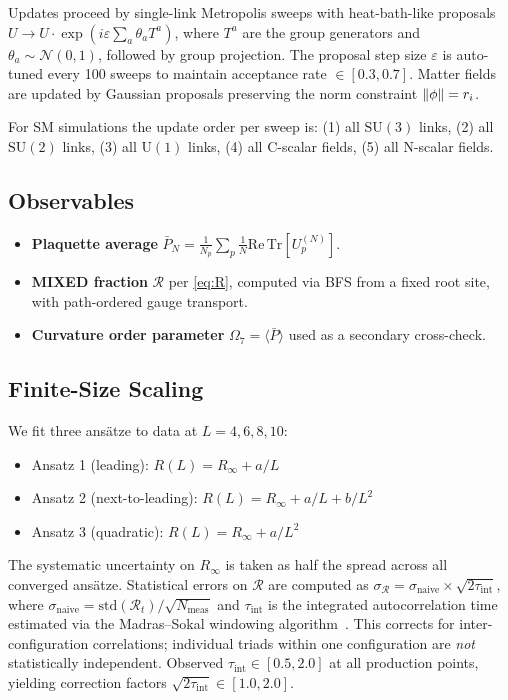 \documentclass[12pt,a4paper]{article}
\newcommand{\R}{\mathcal{R}}           %
\newcommand{\SU}[1]{\mathrm{SU}(#1)}
\newcommand{\UN}[1]{\mathrm{U}(#1)}
\theoremstyle{plain}
\theoremstyle{definition}
\theoremstyle{remark}
\begin{document}
Updates proceed by single-link Metropolis sweeps with heat-bath-like proposals
$U\to U\cdot\exp(i\varepsilon\sum_a\theta_a T^a)$, where $T^a$ are the group generators
and $\theta_a\sim\mathcal{N}(0,1)$, followed by group projection.
The proposal step size $\varepsilon$ is auto-tuned every 100 sweeps to maintain
acceptance rate $\in[0.3,0.7]$.
Matter fields are updated by Gaussian proposals preserving the norm constraint
$\norm{\phi}=r_i$.

For SM simulations the update order per sweep is:
(1) all $\SU{3}$ links, (2) all $\SU{2}$ links, (3) all $\UN{1}$ links,
(4) all C-scalar fields, (5) all N-scalar fields.

\subsection{Observables}
\label{sec:observables}

\begin{itemize}
  \item \textbf{Plaquette average} $\bar{P}_N = \frac{1}{N_p}\sum_p \frac{1}{N}\mathrm{Re}\,\mathrm{Tr}[U_p^{(N)}]$.
  \item \textbf{MIXED fraction} $\R$ per \cref{eq:R}, computed via BFS from a fixed root
        site, with path-ordered gauge transport.
  \item \textbf{Curvature order parameter} $\Omega_7 = \langle\bar{P}\rangle$ used as a
        secondary cross-check.
\end{itemize}

\subsection{Finite-Size Scaling}
\label{sec:fss_method}

We fit three ansätze to data at $L=4,6,8,10$:
\begin{itemize}
  \item Ansatz 1 (leading): $R(L) = R_\infty + a/L$
  \item Ansatz 2 (next-to-leading): $R(L) = R_\infty + a/L + b/L^2$
  \item Ansatz 3 (quadratic): $R(L) = R_\infty + a/L^2$
\end{itemize}
The systematic uncertainty on $R_\infty$ is taken as half the spread across
all converged ansätze.
Statistical errors on $\R$ are computed as
$\sigma_\R = \sigma_\text{naive} \times \sqrt{2\tau_\text{int}}$,
where $\sigma_\text{naive} = \mathrm{std}(\R_t)/\sqrt{N_\text{meas}}$ and
$\tau_\text{int}$ is the integrated autocorrelation time estimated via the
Madras--Sokal windowing algorithm~\citep{Madras1988}.
This corrects for inter-configuration correlations; individual triads within one
configuration are \emph{not} statistically independent.
Observed $\tau_\text{int} \in [0.5, 2.0]$ at all production points,
yielding correction factors $\sqrt{2\tau_\text{int}} \in [1.0, 2.0]$.
\end{document}
